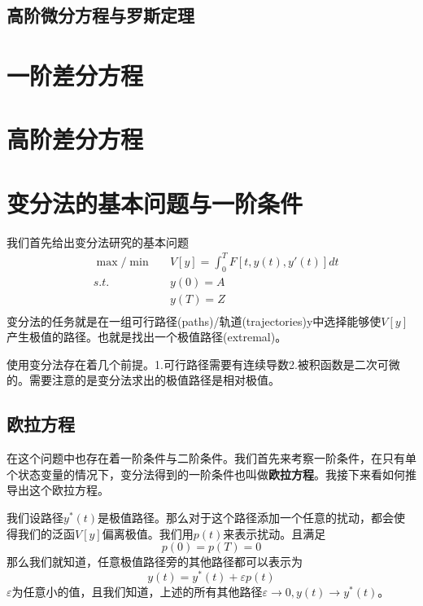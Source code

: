 \documentclass[UTF8,12pt]{ctexart}
\numberwithin{equation}{section} %
\numberwithin{figure}{section}
\numberwithin{table}{section}
\begin{document}
	\subsection{高阶微分方程与罗斯定理}
	\newpage
	
	\section{一阶差分方程}
	
	\section{高阶差分方程}
	
	\newpage
	
	\section{变分法的基本问题与一阶条件}
	我们首先给出变分法研究的基本问题
	\begin{equation}
		\begin{aligned}
			&\max / \min &&V[y] = \int_{0}^{T}F[t,y(t),y'(t)]dt \\
			&s.t. &&y(0) = A \\
			&  &&y(T) = Z \\
		\end{aligned}
	\end{equation}
	变分法的任务就是在一组可行路径(paths)/轨道(trajectories)y中选择能够使$V[y]$产生极值的路径。也就是找出一个极值路径(extremal)。
	
	使用变分法存在着几个前提。1.可行路径需要有连续导数2.被积函数是二次可微的。需要注意的是变分法求出的极值路径是相对极值。
	
	\subsection{欧拉方程}
	在这个问题中也存在着一阶条件与二阶条件。我们首先来考察一阶条件，在只有单个状态变量的情况下，变分法得到的一阶条件也叫做\textbf{欧拉方程}。我接下来看如何推导出这个欧拉方程。
	
	我们设路径$y^*(t)$是极值路径。那么对于这个路径添加一个任意的扰动，都会使得我们的泛函$V[y]$偏离极值。我们用$p(t)$来表示扰动。且满足
	\begin{equation}
		p(0) = p(T) = 0
	\end{equation}
	那么我们就知道，任意极值路径旁的其他路径都可以表示为
	\begin{equation}
		y(t) = y^*(t) + \varepsilon p(t)
	\end{equation}
	$\varepsilon$为任意小的值，且我们知道，上述的所有其他路径$\varepsilon \to 0,y(t) \to y^*(t)$。
	
\end{document}
